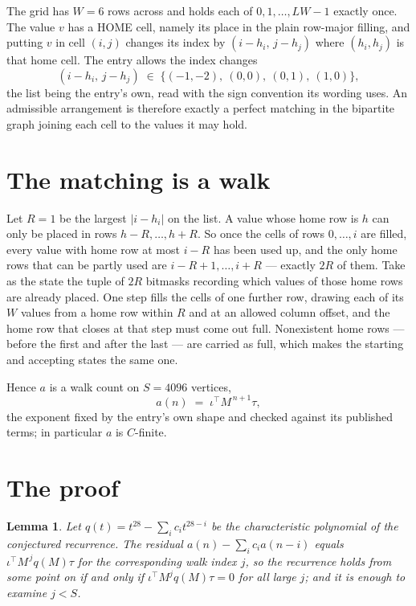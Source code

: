 \documentclass[11pt,a4paper]{article}
\theoremstyle{plain}
\newtheorem{lemma}[theorem]{Lemma}
\theoremstyle{definition}
\begin{document}
The grid has $W=6$ rows across and holds each of $0,1,\dots,LW-1$ exactly once. The value
$v$ has a HOME cell, namely its place in the plain row-major filling, and putting $v$ in cell
$(i,j)$ changes its index by $(i-h_i,\,j-h_j)$ where $(h_i,h_j)$ is that home cell. The entry
allows the index changes
\[
(i-h_i,\,j-h_j)\;\in\;\{(-1,-2),\ (0,0),\ (0,1),\ (1,0)\},
\]
the list being the entry's own, read with the sign convention its wording uses. An admissible
arrangement is therefore exactly a perfect matching in the bipartite graph joining each cell to
the values it may hold.

\section{The matching is a walk}

Let $R=1$ be the largest $|i-h_i|$ on the list. A value whose home row is $h$ can only be
placed in rows $h-R,\dots,h+R$. So once the cells of rows $0,\dots,i$ are filled, every
value with home row at most $i-R$ has been used up, and the only home rows that can be
partly used are $i-R+1,\dots,i+R$ --- exactly $2R$ of them. Take as the state the tuple of
$2R$ bitmasks recording which values of those home rows are already placed. One step fills
the cells of one further row, drawing each of its $W$ values from a home row within $R$
and at an allowed column offset, and the home row that closes at that step must come out
full. Nonexistent home rows --- before the first and after the last --- are carried as
full, which makes the starting and accepting states the same one.

Hence $a$ is a walk count on $S=4096$ vertices,
\[
a(n)\;=\;\iota^{\!\top}M^{\,n+1}\tau ,
\]
the exponent fixed by the entry's own shape and checked against its published terms; in
particular $a$ is $C$-finite.

\section{The proof}

\begin{lemma}\label{lem:crit}
Let $q(t)=t^{28}-\sum_i c_it^{28-i}$ be the characteristic polynomial of the
conjectured recurrence. The residual $a(n)-\sum_ic_ia(n-i)$ equals
$\iota^{\!\top}M^{\,j}q(M)\tau$ for the corresponding walk index $j$, so the recurrence
holds from some point on if and only if $\iota^{\!\top}M^{j}q(M)\tau=0$ for all large $j$;
and it is enough to examine $j<S$.
\end{lemma}
\end{document}
